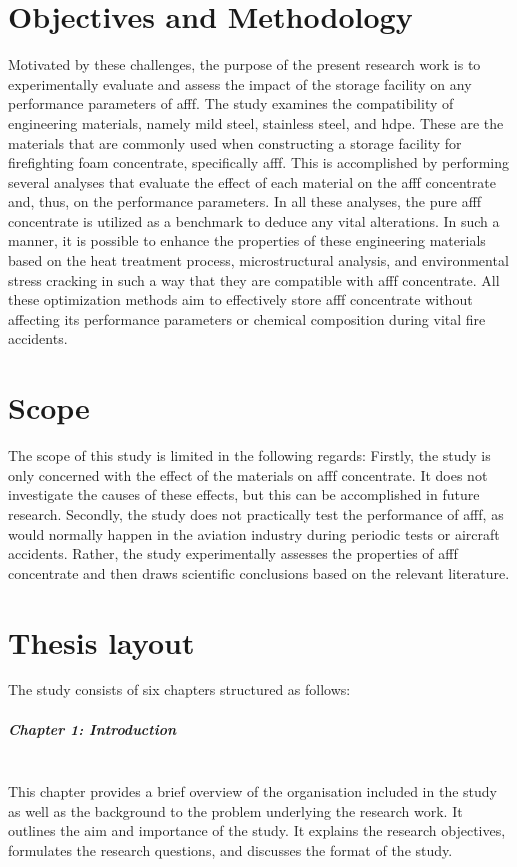 \section{Objectives and Methodology}
Motivated by these challenges, the purpose of the present research work is to experimentally evaluate and assess the impact of the storage facility on any performance parameters of \acrshort{afff}. The study examines the compatibility of engineering materials, namely mild steel, stainless steel, and \acrfull{hdpe}. These are the materials that are commonly used when constructing a storage facility for firefighting foam concentrate, specifically \acrshort{afff}. This is accomplished by performing several analyses that evaluate the effect of each material on the \acrshort{afff} concentrate and, thus, on the performance parameters. In all these analyses, the pure \acrshort{afff} concentrate is utilized as a benchmark to deduce any vital alterations. In such a manner, it is possible to enhance the properties of these engineering materials based on the heat treatment process, microstructural analysis, and environmental stress cracking in such a way that they are compatible with \acrshort{afff} concentrate. All these optimization methods aim to effectively store \acrshort{afff} concentrate without affecting its performance parameters or chemical composition during vital fire accidents.

\section{Scope}
The scope of this study is limited in the following regards: Firstly, the study is only concerned with the effect of the materials on \acrshort{afff} concentrate. It does not investigate the causes of these effects, but this can be accomplished in future research. Secondly, the study does not practically test the performance of \acrshort{afff}, as would normally happen in the aviation industry during periodic tests or aircraft accidents. Rather, the study experimentally assesses the properties of \acrshort{afff} concentrate and then draws scientific conclusions based on the relevant literature.

\section{Thesis layout}
The study consists of six chapters structured as follows:

\subparagraph*{Chapter 1: Introduction}\hfill\\
This chapter provides a brief overview of the organisation included in the study as well as the background to the problem underlying the research work. It outlines the aim and importance of the study. It explains the research objectives, formulates the research questions, and discusses the format of the study.

